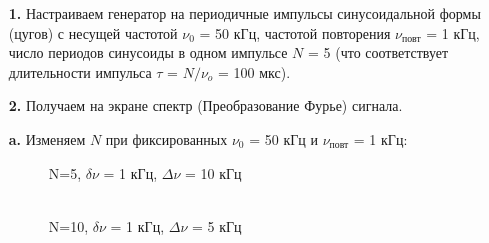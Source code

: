 \documentclass[a4paper,12pt]{article} %
\begin{document}
\begin{enumerate}
	\item [\textbf{1.}] Настраиваем генератор на периодичные импульсы синусоидальной формы (цугов) с несущей частотой $\nu_0$ = 50 кГц, частотой повторения $\nu_\text{повт}$ = 1 кГц, число периодов синусоиды в одном импульсе $N$ = 5 (что соответствует длительности импульса $\tau$ = $N/\nu_o$ = 100 мкс).

	\item [\textbf{2.}] Получаем на экране спектр (Преобразование Фурье) сигнала.

	      \textbf{a.} Изменяем $N$ при фиксированных $\nu_0$ = 50 кГц и $\nu_\text{повт}$ = 1 кГц:

	      \begin{figure}[h]
		      \begin{minipage}[h]{0.47\linewidth}
			       N=5, $\delta \nu$ = 1 кГц, $\Delta \nu$ = 10 кГц\\
		      \end{minipage}
		      \hfill
		      \begin{minipage}[h]{0.47\linewidth}
			       \\N=10, $\delta \nu$ = 1 кГц, $\Delta \nu$ = 5 кГц

\end{minipage}
\end{figure}
\end{enumerate}
\end{document}
